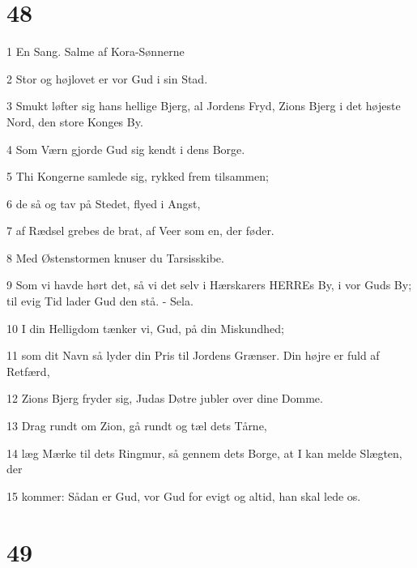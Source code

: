 \chapter{48}

\par 1 En Sang. Salme af Kora-Sønnerne
\par 2 Stor og højlovet er vor Gud i sin Stad.
\par 3 Smukt løfter sig hans hellige Bjerg, al Jordens Fryd, Zions Bjerg i det højeste Nord, den store Konges By.
\par 4 Som Værn gjorde Gud sig kendt i dens Borge.
\par 5 Thi Kongerne samlede sig, rykked frem tilsammen;
\par 6 de så og tav på Stedet, flyed i Angst,
\par 7 af Rædsel grebes de brat, af Veer som en, der føder.
\par 8 Med Østenstormen knuser du Tarsisskibe.
\par 9 Som vi havde hørt det, så vi det selv i Hærskarers HERREs By, i vor Guds By; til evig Tid lader Gud den stå. - Sela.
\par 10 I din Helligdom tænker vi, Gud, på din Miskundhed;
\par 11 som dit Navn så lyder din Pris til Jordens Grænser. Din højre er fuld af Retfærd,
\par 12 Zions Bjerg fryder sig, Judas Døtre jubler over dine Domme.
\par 13 Drag rundt om Zion, gå rundt og tæl dets Tårne,
\par 14 læg Mærke til dets Ringmur, så gennem dets Borge, at I kan melde Slægten, der
\par 15 kommer: Sådan er Gud, vor Gud for evigt og altid, han skal lede os.

\chapter{49}

